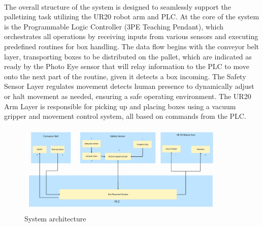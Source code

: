 

\paragraph{}The overall structure of the system is designed to seamlessly support the palletizing task utilizing the UR20 robot arm and PLC. At the core of the system is the Programmable Logic Controller (3PE Teaching Pendant), which orchestrates all operations by receiving inputs from various sensors and executing predefined routines for box handling. The data flow begins with the conveyor belt layer, transporting boxes to be distributed on the pallet, which are indicated as ready by the Photo Eye sensor that will relay information to the PLC to move onto the next part of the routine, given it detects a box incoming. The Safety Sensor Layer regulates movement detects human presence to dynamically adjust or halt movement as needed, ensuring a safe operating environment. The UR20 Arm Layer is responsible for picking up and placing boxes using a vacuum gripper and movement control system, all based on commands from the PLC.

\begin{figure}[h!]
	\centering
 	\includegraphics[width=0.90\textwidth]{images/dataflow.png}
 \caption{System architecture}
\end{figure}